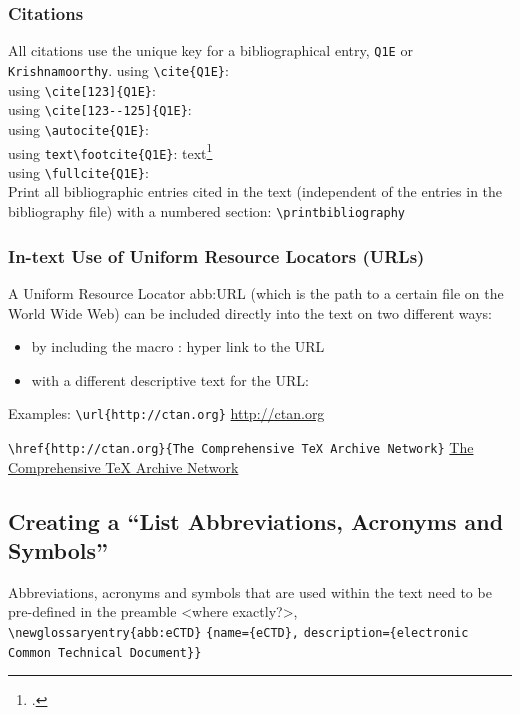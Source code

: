 \subsubsection{Citations}
All citations use the unique key for a bibliographical entry, \eg \verb|Q1E| or \verb|Krishnamoorthy|.%
using \verb|\cite{Q1E}|: \cite{Q1E}\\%
using \verb|\cite[123]{Q1E}|: \cite[123]{Q1E}\\%
using \verb|\cite[123--125]{Q1E}|: \cite[123--125]{Q1E}\\%
using \verb|\autocite{Q1E}|: \autocite{Q1E}\\%
using \verb|text\footcite{Q1E}|: text\footcite{Q1E}\\%
using \verb|\fullcite{Q1E}|: \\%
Print all bibliographic entries cited in the text (independent of the entries in the bibliography file) with a numbered section:%
\verb|\printbibliography|%
\printbibliography%

\subsubsection{In-text Use of Uniform Resource Locators (URLs)}
A Uniform Resource Locator \gls{abb:URL} (which is the path to a certain file on the World Wide Web)
can be included directly into the text on two different ways:
\begin{itemize}
\item by including the macro : hyper link to the URL
\item with a different descriptive text for the URL: 
\end{itemize}

Examples:%
\verb|\url{http://ctan.org}| \url{http://ctan.org}

\verb|\href{http://ctan.org}{The Comprehensive TeX Archive Network}| \href{http://ctan.org}{The Comprehensive TeX Archive Network}

\subsection{Creating a \enquote{List Abbreviations, Acronyms and Symbols}}\label{sec:glossary}
Abbreviations, acronyms and symbols that are used within the text need to be pre-defined  in the
preamble <where exactly?>, \eg\\
\verb|\newglossaryentry{abb:eCTD}|\newline
\hspace*{2em}\verb|{name={eCTD},|\newline
\hspace*{2em}\verb|description={electronic Common Technical Document}}|

